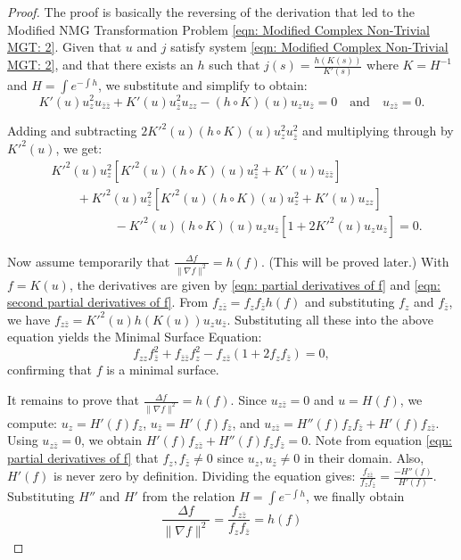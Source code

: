 \documentclass[10pt,a4paper]{amsart}
\begin{document}
\begin{proof}
	The proof is basically the reversing of the derivation that led to the Modified NMG Transformation Problem \ref{eqn: Modified Complex Non-Trivial MGT: 2}. Given that \(u\) and \(j\) satisfy system \ref{eqn: Modified Complex Non-Trivial MGT: 2}, and that there exists an \(h\) such that \(j(s) = \frac{h(K(s))}{K'(s)}\) where \(K = H^{-1}\) and \(H = \int e^{-\int h}\), we substitute and simplify to obtain:
	\[
	K'(u) u_z^2 u_{\bar{z}\bar{z}} + K'(u) u_{\bar{z}}^2 u_{zz} - (h \circ K)(u) u_z u_{\bar{z}} = 0 \quad \text{and} \quad u_{z\bar{z}} = 0.
	\]
	
	Adding and subtracting \(2 {K'}^2(u) (h \circ K)(u) u_z^2 u_{\bar{z}}^2\) and multiplying through by \({K'}^2(u)\), we get:
	\begin{align*}
		&{K'}^2(u) u_z^2 \left[{K'}^2(u) (h \circ K)(u) u_{\bar{z}}^2 + K'(u) u_{\bar{z}\bar{z}}\right] \\
		&\quad\quad + {K'}^2(u) u_{\bar{z}}^2 \left[{K'}^2(u) (h \circ K)(u) u_z^2 + K'(u) u_{zz}\right] \\
		&\quad\quad\quad\quad\quad- {K'}^2(u) (h \circ K)(u) u_z u_{\bar{z}} \left[1 + 2 {K'}^2(u) u_z u_{\bar{z}}\right] = 0.
	\end{align*}
	
	Now assume temporarily that \(\frac{\Delta f}{\|\nabla f\|^2} = h(f)\). (This will be proved later.) With \(f = K(u)\), the derivatives are given by \ref{eqn: partial derivatives of f} and \ref{eqn: second partial derivatives of f}. From \(f_{z\bar{z}} = f_z f_{\bar{z}} h(f)\) and substituting \(f_z\) and \(f_{\bar{z}}\), we have \(f_{z\bar{z}} = {K'}^2(u) h(K(u)) u_z u_{\bar{z}}\). Substituting all these into the above equation yields the Minimal Surface Equation:
	\[
	f_{zz} f_{\bar{z}}^2 + f_{\bar{z}\bar{z}} f_z^2 - f_{z\bar{z}}(1 + 2 f_z f_{\bar{z}}) = 0,
	\]
	confirming that \(f\) is a minimal surface.
	
	It remains to prove that \(\frac{\Delta f}{\|\nabla f\|^2} = h(f)\). Since \(u_{z\bar{z}} = 0\) and \(u = H(f)\), we compute: \(u_z = H'(f) f_z\), \(u_{\bar{z}} = H'(f) f_{\bar{z}}\), and \(u_{z\bar{z}} = H''(f) f_z f_{\bar{z}} + H'(f) f_{z\bar{z}}\). Using \(u_{z\bar{z}} = 0\), we obtain \(H'(f) f_{z\bar{z}} + H''(f) f_z f_{\bar{z}} = 0\). Note from equation \ref{eqn: partial derivatives of f} that \(f_z, f_{\bar{z}} \neq 0\) since \(u_z, u_{\bar{z}} \neq 0\) in their domain. Also, \(H'(f)\) is never zero by definition. Dividing the equation gives: \( \frac{f_{z\bar{z}}}{f_z f_{\bar{z}}} = \frac{-H''(f)}{H'(f)}\).	Substituting \(H''\) and \(H'\) from the relation \(H = \int e^{-\int h}\), we finally obtain 
	\[
	  \frac{\Delta f}{\|\nabla f\|^2} = \frac{f_{z\bar{z}}}{f_z f_{\bar{z}}} = h(f)
	\]
\end{proof}
\end{document}
